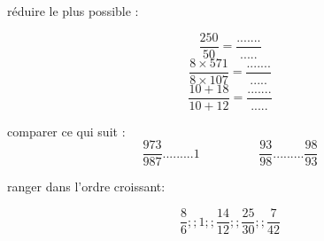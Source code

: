 \documentclass[addpoints]{exam}
\begin{document}
\begin{tcolorbox}[title=Exercice 3]
	\begin{questions}
		\question réduire le plus possible :
		
		\[\dfrac{250}{50}=\dfrac{.......}{.....}\]
\[\dfrac{8\times 571}{8 \times 107}=\dfrac{.......}{.....}\]
\[\dfrac{10+18}{10+12}=\dfrac{.......}{.....}\]
		
	\end{questions}
\end{tcolorbox}		

\begin{tcolorbox}[title=Exercice 4]
	\begin{questions}
		\question comparer ce qui suit  :	
$$\dfrac{973}{987}......... 1 \hspace{1cm}   \hspace{1cm}
\dfrac{93}{98}.........\dfrac{98}{93}$$

\question ranger dans l'ordre croissant:

$$\dfrac{8}{6} ;; 1 ;; \dfrac{14}{12} ;; \dfrac{25}{30}  ;; \dfrac{7}{42}$$	

\end{questions}
\end{tcolorbox}	
	
	
\end{document}
